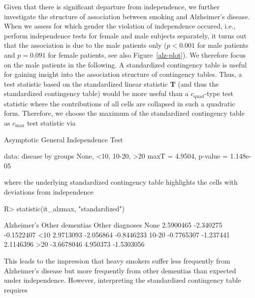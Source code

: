 \documentclass{article}
\newcommand{\T}{\mathbf{T}}
\newenvironment{Schunk}{}{}
\begin{document}
Given that there is significant departure from independence, we further
investigate the structure of association between smoking and Alzheimer's
disease. When we assess for which gender the violation of independence  
occured, i.e., perform independence tests for female and male
subjects separately, 
it turns out that the association is due to the male patients only
($p < 0.001$ for male patients and $p = 0.091$
for female patients, see also Figure~\ref{alz-plot}). 
We therefore focus on the male patients in the following.
A standardized contingency table is useful for gaining insight into the 
association structure of contingency tables. 
Thus, a test statistic based on the standardized linear statistic 
$\T$ (and thus the standardized contingency table) would be more useful than a
$c_\text{quad}$-type test statistic where the contributions of all cells are 
collapsed in such a quadratic form. Therefore, we choose the 
maximum of the standardized contingency table as $c_\text{max}$ test statistic via
\begin{Schunk}
\begin{Soutput}
	Asymptotic General Independence Test

data:  disease by groups None, <10, 10-20, >20 
maxT = 4.9504, p-value = 1.148e-05
\end{Soutput}
\end{Schunk}
where the underlying standardized contingency table highlights the cells with
deviations from independence
\begin{Schunk}
\begin{Sinput}
R> statistic(it_alzmax, "standardized")
\end{Sinput}
\begin{Soutput}
      Alzheimer's Other dementias Other diagnoses
None    2.5900465       -2.340275      -0.1522407
<10     2.9713093       -2.056864      -0.8446233
10-20  -0.7765307       -1.237441       2.1146396
>20    -3.6678046        4.950373      -1.5303056
\end{Soutput}
\end{Schunk}
This leads to the impression that heavy smokers suffer less frequently
from Alzheimer's disease but more frequently from other dementias
than expected under independence.
However, interpreting the standardized contingency table requires
\end{document}
